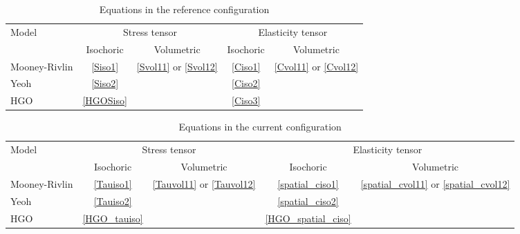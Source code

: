 \begin{table}
\centering
\caption{Equations in the reference configuration}
\label{summary1}
\begin{tabular}{l c c c c} 
\toprule
\multirow{2}{*}{Model}  &  \multicolumn{2}{c}{Stress tensor} &  \multicolumn{2}{c}{Elasticity tensor} \\
\cmidrule(l){2-5}
& Isochoric  & Volumetric &  Isochoric  & Volumetric  \\
\midrule
Mooney-Rivlin  & \ref{Siso1} & \multirow{3}{*}{\ref{Svol11} or \ref{Svol12}} & \ref{Ciso1} & \multirow{3}{*}{\ref{Cvol11} or \ref{Cvol12}} \\
Yeoh & \ref{Siso2} & & \ref{Ciso2} &\\
HGO & \ref{HGOSiso} & & \ref{Ciso3} &\\ 
\bottomrule
\end{tabular}
\end{table}

\begin{table}
\centering
\caption{Equations in the current configuration}
\label{summary2}
\begin{tabular}{l c c c c} 
\toprule
\multirow{2}{*}{Model}  &  \multicolumn{2}{c}{Stress tensor} &  \multicolumn{2}{c}{Elasticity tensor} \\
\cmidrule(l){2-5}
& Isochoric  & Volumetric &  Isochoric  & Volumetric  \\
\midrule
Mooney-Rivlin  & \ref{Tauiso1} & \multirow{3}{*}{\ref{Tauvol11} or \ref{Tauvol12}} & \ref{spatial_ciso1} & \multirow{3}{*}{\ref{spatial_cvol11} or \ref{spatial_cvol12}} \\
Yeoh & \ref{Tauiso2} & & \ref{spatial_ciso2} &\\
HGO & \ref{HGO_tauiso} & & \ref{HGO_spatial_ciso} &\\ 
\bottomrule
\end{tabular}
\end{table}